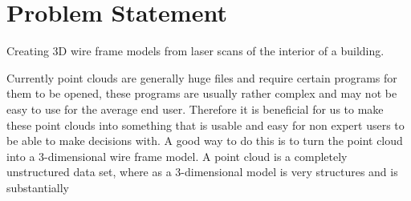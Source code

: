 

\section{Problem Statement}

Creating 3D wire frame models from laser scans of the interior of a building.

Currently point clouds are generally huge files and require certain programs for them to be opened, these programs are usually rather complex and may not be easy to use for the average end user. Therefore it is beneficial for us to make these point clouds into something that is usable and easy for non expert users to be able to make decisions with. A good way to do this is to turn the point cloud into a 3-dimensional wire frame model. A point cloud is a completely unstructured data set, where as a 3-dimensional model is very structures and is substantially 
